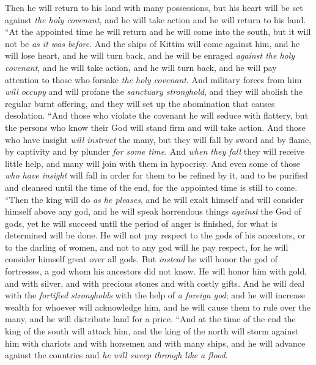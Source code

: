 \begin{biblechapter}
\verse Then he will return to his land with many possessions, but his heart will be set against \textit{the holy covenant}, and he will take action and he will return to his land.
\verse “At the appointed time he will return and he will come into the south, but it will not be \textit{as it was before}.
\verse And the ships of Kittim will come against him, and he will lose heart, and he will turn back, and he will be enraged \textit{against the holy covenant}, and he will take action, and he will turn back, and he will pay attention to those who forsake \textit{the holy covenant}.
\verse And military forces from him \textit{will occupy} and will profane the \textit{sanctuary stronghold}, and they will abolish the regular burnt offering, and they will set up the abomination that causes desolation.
\verse “And those who violate the covenant he will seduce with flattery, but the persons who know their God will stand firm and will take action.
\verse And those who have insight \textit{will instruct} the many, but they will fall by sword and by flame, by captivity and by plunder \textit{for some time}.
\verse And \textit{when they fall} they will receive little help, and many will join with them in hypocrisy.
\verse And even some of those \textit{who have insight}﻿ will fall in order for them to be refined by it, and to be purified and cleansed until the time of the end, for the appointed time is still to come.
\verse “Then the king will do \textit{as he pleases}, and he will exalt himself and will consider himself above any god, and he will speak horrendous things \textit{against} the God of gods, yet he will succeed until the period of anger is finished, for what is determined will be done.
\verse He will not pay respect to the gods of his ancestors, or to the darling of women, and not to any god will he pay respect, for he will consider himself great over all gods.
\verse But \textit{instead} he will honor the god of fortresses, a god whom his ancestors did not know. He will honor him with gold, and with silver, and with precious stones and with costly gifts.
\verse And he will deal with the \textit{fortified strongholds} with the help of \textit{a foreign god}; and he will increase wealth for whoever will acknowledge him, and he will cause them to rule over the many, and he will distribute land for a price.
\verse “And at the time of the end the king of the south will attack him, and the king of the north will storm against him with chariots and with horsemen and with many ships, and he will advance against the countries and \textit{he will sweep through like a flood}.

\end{biblechapter}
